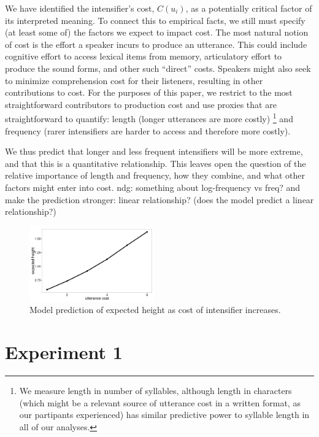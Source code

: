 \documentclass[10pt,letterpaper]{article}
\newcommand{\todo}[1]{{\color{red}#1}}
\begin{document}
We have identified the intensifier's cost, $C(u_{i})$, as a potentially critical factor of its interpreted meaning. To connect this to empirical facts, we still must specify (at least some of) the factors we expect to impact cost.
%
The most natural notion of cost is the effort a speaker incurs to produce an utterance. This could include cognitive effort to access lexical items from memory, articulatory effort to produce the sound forms, and other such ``direct'' costs. Speakers might also seek to minimize comprehension cost for their listeners, resulting in other contributions to cost. 
For the purposes of this paper, we restrict to the most straightforward contributors to production cost and use proxies that are straightforward to quantify: length (longer utterances are more costly)
\footnote{We measure length in number of syllables, although length in characters (which might be a relevant source of utterance cost in a written format, as our partipants experienced) has similar predictive power to syllable length in all of our analyses.}
and frequency (rarer intensifiers are harder to access and therefore more costly).

We thus predict that longer and less frequent intensifiers will be more extreme, and that this is a quantitative relationship. 
This leaves open the question of the relative importance of length and frequency, how they combine, and what other factors might enter into cost.
\todo{ndg: something about log-frequency vs freq? and make the prediction stronger: linear relationship? (does the model predict a linear relationship?)}

\begin{figure}[ht]
\begin{center}
\includegraphics[width=0.48\textwidth]{analysis_files_for_writeup/images/height-by-cost.png}
\end{center}
\caption{Model prediction of expected height as cost of intensifier increases.} 
\label{model-heights}
\end{figure}

\section{Experiment 1}
\end{document}
